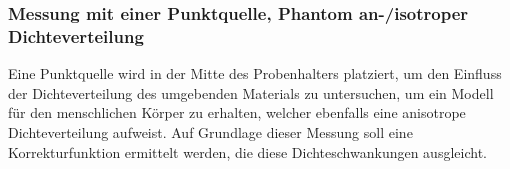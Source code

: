 	\subsubsection{Messung mit einer Punktquelle, Phantom an-/isotroper Dichteverteilung}
	Eine Punktquelle wird in der Mitte des Probenhalters platziert, um den Einfluss der Dichteverteilung des umgebenden Materials zu untersuchen, um ein Modell für den menschlichen Körper zu erhalten, welcher ebenfalls eine anisotrope Dichteverteilung aufweist. Auf Grundlage dieser Messung soll eine Korrekturfunktion ermittelt werden, die diese Dichteschwankungen ausgleicht.